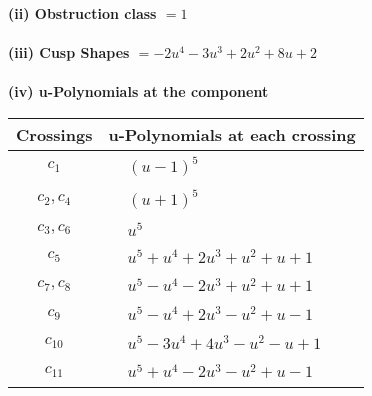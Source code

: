 \documentclass[1p]{elsarticle_modified}
\theoremstyle{definition}
\begin{document}
\flushleft \textbf{(ii) Obstruction class $= 1$}\\~\\
\flushleft \textbf{(iii) Cusp Shapes $= -2 u^4-3 u^3+2 u^2+8 u+2$}\\~\\
\newpage\renewcommand{\arraystretch}{1}
\flushleft \textbf{(iv) u-Polynomials at the component}\newline \\
\begin{tabular}{m{50pt}|m{274pt}}
Crossings & \hspace{64pt}u-Polynomials at each crossing \\
\hline $$\begin{aligned}c_{1}\end{aligned}$$&$\begin{aligned}
&(u-1)^5
\end{aligned}$\\
\hline $$\begin{aligned}c_{2},c_{4}\end{aligned}$$&$\begin{aligned}
&(u+1)^5
\end{aligned}$\\
\hline $$\begin{aligned}c_{3},c_{6}\end{aligned}$$&$\begin{aligned}
&u^5
\end{aligned}$\\
\hline $$\begin{aligned}c_{5}\end{aligned}$$&$\begin{aligned}
&u^5+u^4+2 u^3+u^2+u+1
\end{aligned}$\\
\hline $$\begin{aligned}c_{7},c_{8}\end{aligned}$$&$\begin{aligned}
&u^5- u^4-2 u^3+u^2+u+1
\end{aligned}$\\
\hline $$\begin{aligned}c_{9}\end{aligned}$$&$\begin{aligned}
&u^5- u^4+2 u^3- u^2+u-1
\end{aligned}$\\
\hline $$\begin{aligned}c_{10}\end{aligned}$$&$\begin{aligned}
&u^5-3 u^4+4 u^3- u^2- u+1
\end{aligned}$\\
\hline $$\begin{aligned}c_{11}\end{aligned}$$&$\begin{aligned}
&u^5+u^4-2 u^3- u^2+u-1
\end{aligned}$\\
\hline
\end{tabular}\\~\\
\end{document}

